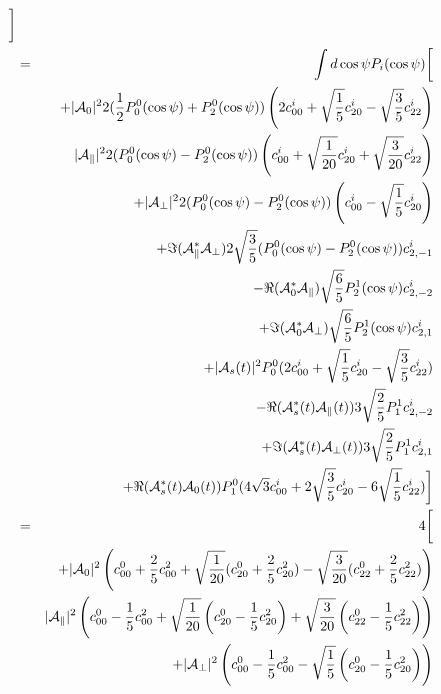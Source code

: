 \documentclass[a4paper,10pt,twosided]{article}
\begin{document}
\begin{eqnarray}
          \biggr] \\
      &=& \int d\cos\psi   P_i(\cos\psi) \biggl[  \\
          &&                  +|{\cal A}_0|^2 2 (\frac{1}{2}P_0^0(\cos\psi)+P_2^0(\cos\psi) ) \left( 2 c^i_{00}+\sqrt{\frac{1}{ 5}}c^i_{20}-\sqrt{\frac{3}{ 5}}c^i_{22} \right) \\
          &&                   |{\cal A}_\parallel|^2 2( P_0^0(\cos\psi) - P_2^0(\cos\psi)  )           \left( c^i_{00}  +\sqrt{\frac{1}{20}}c^i_{20}+\sqrt{\frac{3}{20}}c^i_{22}  \right)  \\
          &&                  +|{\cal A}_\perp|^2 2 ( P_0^0(\cos\psi) - P_2^0(\cos\psi)  )              \left( c^i_{00}  -\sqrt{\frac{1}{ 5}}c^i_{20}\right)\\
          &&                  +\Im({\cal A}_\parallel^*{\cal A}_\perp)2\sqrt{\frac{3}{5}} ( P_0^0(\cos\psi) - P_2^0(\cos\psi)  ) c^i_{2,-1}  \\
          &&                  -\Re({\cal A}_0^*{\cal A}_\parallel  )  \sqrt{\frac{6}{5}}P_2^1(\cos\psi) c^i_{2,-2}\\ 
          &&                  +\Im({\cal A}_0^* {\cal A}_\perp )      \sqrt{\frac{6}{5}}P_2^1(\cos\psi)c^i_{2,1} \\
          &&                  +|{\cal A}_{s}(t)|^2  P_0^0 (2c^i_{00} + \sqrt{\frac{1}{5}}c^i_{20} -\sqrt{\frac{3}{5}} c^i_{22}) \\
          &&                  -\Re({\cal A}_{s}^*(t){\cal A}_\parallel(t)) 3\sqrt{\frac{2}{5}} P_1^1 c^i_{2,-2}\\
          &&                  +\Im({\cal A}_{s}^*(t){\cal A}_\perp(t)) 3\sqrt{\frac{2}{5}} P_1^1 c^i_{2,1}\\
          &&                  +\Re({\cal A}_{s}^*(t){\cal A}_0(t)) P_1^0( 4\sqrt{3}  c^i_{00} + 2 \sqrt{\frac{3}{5}} c^i_{20} - 6 \sqrt{\frac{1}{5}}c^i_{22})
      \biggr] \\
      &=& 4\biggl[ \\
         &&                   +|{\cal A}_0|^2   \left( c^0_{00}+\frac{2}{5}c^2_{00}+\sqrt{\frac{1}{20}}(c^0_{20}+\frac{2}{5}c^2_{20})-\sqrt{\frac{3}{20}}(c^0_{22}+\frac{2}{5}c^2_{22}) \right) \\
         &&                    |{\cal A}_\parallel|^2 \left( c^0_{00}-\frac{1}{5}c^2_{00}+\sqrt{\frac{1}{20}}\left(c^0_{20}-\frac{1}{5}c^2_{20}\right)+\sqrt{\frac{3}{20}}\left(c^0_{22}-\frac{1}{5}c^2_{22}\right)  \right)  \\
         &&                   +|{\cal A}_\perp|^2    \left( c^0_{00}-\frac{1}{5}c^2_{00} - \sqrt{\frac{1}{5}}\left(c^0_{20}-\frac{1}{5}c^2_{20}\right)\right)\\

\end{eqnarray}
\end{document}

